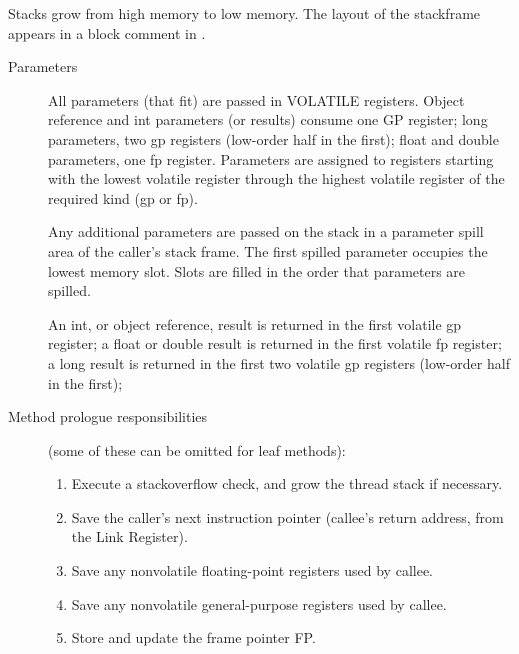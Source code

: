 
Stacks grow from high memory to low memory.
The layout of the stackframe appears in a block comment in
{\PPCStackframeLayoutURL}.


\begin{description}
\item[Parameters]

    All parameters (that fit) are passed in VOLATILE registers.  Object
    reference and int parameters (or results) consume one GP register; long
    parameters, two gp registers (low-order half in the first);  float and
    double parameters, one fp register.  Parameters are 
    assigned to registers
    starting with the lowest volatile register through the highest volatile
    register of the required kind (gp or fp).

    Any additional parameters are passed on the stack in a parameter spill
    area of the caller's stack frame.  The first spilled parameter occupies
    the lowest memory slot.  Slots are filled in the order that parameters
    are spilled.

    An int, or object reference, result is returned in the first volatile
    gp register; a float or double result is returned in the first volatile
    fp register; a long result is returned in the first two volatile gp
    registers (low-order half in the first);

\item [Method prologue responsibilities] (some of these can be omitted for leaf
  methods):

\begin{enumerate}
\item Execute a stackoverflow check, and grow the thread stack if necessary.

\item Save the caller's next instruction pointer (callee's return address,
       from the Link Register).

\item Save any nonvolatile floating-point registers used by callee.

\item Save any nonvolatile general-purpose registers used by callee.

\item Store and update the frame pointer FP.


\end{enumerate}
\end{description}
